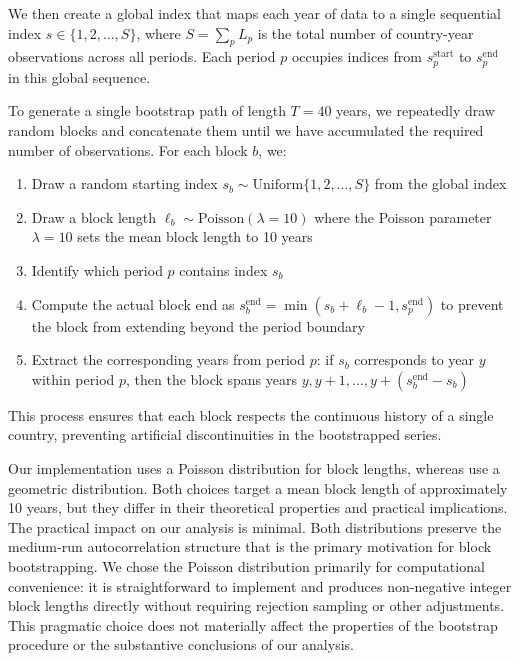 \documentclass[11pt]{article}
\begin{document}
We then create a global index that maps each year of data to a single sequential index $s \in \{1, 2, \ldots, S\}$, where $S = \sum_p L_p$ is the total number of country-year observations across all periods. Each period $p$ occupies indices from $s_p^{\text{start}}$ to $s_p^{\text{end}}$ in this global sequence.

To generate a single bootstrap path of length $T = 40$ years, we repeatedly draw random blocks and concatenate them until we have accumulated the required number of observations. For each block $b$, we:

\begin{enumerate}
    \item Draw a random starting index $s_b \sim \text{Uniform}\{1, 2, \ldots, S\}$ from the global index
    \item Draw a block length $\ell_b \sim \text{Poisson}(\lambda = 10)$ where the Poisson parameter $\lambda = 10$ sets the mean block length to 10 years
    \item Identify which period $p$ contains index $s_b$
    \item Compute the actual block end as $s_b^{\text{end}} = \min(s_b + \ell_b - 1, s_p^{\text{end}})$ to prevent the block from extending beyond the period boundary
    \item Extract the corresponding years from period $p$: if $s_b$ corresponds to year $y$ within period $p$, then the block spans years $y, y+1, \ldots, y + (s_b^{\text{end}} - s_b)$
\end{enumerate}

This process ensures that each block respects the continuous history of a single country, preventing artificial discontinuities in the bootstrapped series.

Our implementation uses a Poisson distribution for block lengths, whereas \textcite{anarkulova2025beyond} use a geometric distribution. Both choices target a mean block length of approximately 10 years, but they differ in their theoretical properties and practical implications. The practical impact on our analysis is minimal. Both distributions preserve the medium-run autocorrelation structure that is the primary motivation for block bootstrapping. We chose the Poisson distribution primarily for computational convenience: it is straightforward to implement and produces non-negative integer block lengths directly without requiring rejection sampling or other adjustments. This pragmatic choice does not materially affect the properties of the bootstrap procedure or the substantive conclusions of our analysis.
\end{document}
